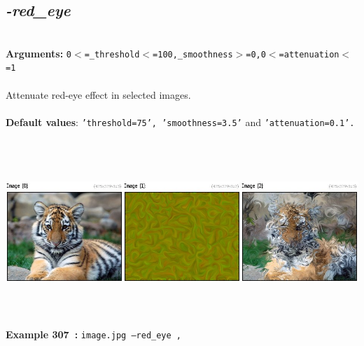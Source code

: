 \documentclass[a4paper,11pt,twoside]{book}
\begin{document}
\subsection{\emph{-red\_eye} }\vspace*{-0.5em}
~\\\textbf{Arguments: } 
{\small \texttt{0$<$=\_threshold$<$=100,\_smoothness$>$=0,0$<$=attenuation$<$=1}}\\~\\
Attenuate red-eye effect in selected images.
~\\~\\\textbf{Default values}: {\small \texttt{'threshold=75', 'smoothness=3.5'} and \texttt{'attenuation=0.1'.}}
\begin{center}\includegraphics[keepaspectratio=true,height=7cm,width=\textwidth]{img/gmic_def307.jpg}\\
{\footnotesize \textbf{Example 307~:} \texttt{image.jpg --red\_eye ,}}
\end{center}
\end{document}
